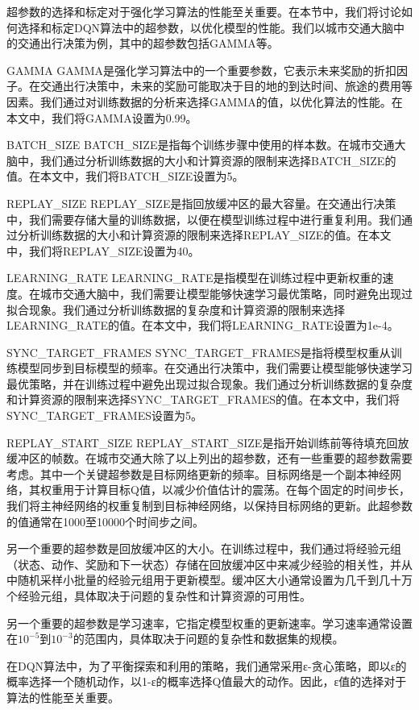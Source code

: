 超参数的选择和标定对于强化学习算法的性能至关重要。在本节中，我们将讨论如何选择和标定DQN算法中的超参数，以优化模型的性能。我们以城市交通大脑中的交通出行决策为例，其中的超参数包括GAMMA等。

GAMMA
GAMMA是强化学习算法中的一个重要参数，它表示未来奖励的折扣因子。在交通出行决策中，未来的奖励可能取决于目的地的到达时间、旅途的费用等因素。我们通过对训练数据的分析来选择GAMMA的值，以优化算法的性能。在本文中，我们将GAMMA设置为0.99。

BATCH\_SIZE
BATCH\_SIZE是指每个训练步骤中使用的样本数。在城市交通大脑中，我们通过分析训练数据的大小和计算资源的限制来选择BATCH\_SIZE的值。在本文中，我们将BATCH\_SIZE设置为5。

REPLAY\_SIZE
REPLAY\_SIZE是指回放缓冲区的最大容量。在交通出行决策中，我们需要存储大量的训练数据，以便在模型训练过程中进行重复利用。我们通过分析训练数据的大小和计算资源的限制来选择REPLAY\_SIZE的值。在本文中，我们将REPLAY\_SIZE设置为40。

LEARNING\_RATE
LEARNING\_RATE是指模型在训练过程中更新权重的速度。在城市交通大脑中，我们需要让模型能够快速学习最优策略，同时避免出现过拟合现象。我们通过分析训练数据的复杂度和计算资源的限制来选择LEARNING\_RATE的值。在本文中，我们将LEARNING\_RATE设置为1e-4。

SYNC\_TARGET\_FRAMES
SYNC\_TARGET\_FRAMES是指将模型权重从训练模型同步到目标模型的频率。在交通出行决策中，我们需要让模型能够快速学习最优策略，并在训练过程中避免出现过拟合现象。我们通过分析训练数据的复杂度和计算资源的限制来选择SYNC\_TARGET\_FRAMES的值。在本文中，我们将SYNC\_TARGET\_FRAMES设置为5。

REPLAY\_START\_SIZE
REPLAY\_START\_SIZE是指开始训练前等待填充回放缓冲区的帧数。在城市交通大除了以上列出的超参数，还有一些重要的超参数需要考虑。其中一个关键超参数是目标网络更新的频率。目标网络是一个副本神经网络，其权重用于计算目标Q值，以减少价值估计的震荡。在每个固定的时间步长，我们将主神经网络的权重复制到目标神经网络，以保持目标网络的更新。此超参数的值通常在1000至10000个时间步之间。

另一个重要的超参数是回放缓冲区的大小。在训练过程中，我们通过将经验元组（状态、动作、奖励和下一状态）存储在回放缓冲区中来减少经验的相关性，并从中随机采样小批量的经验元组用于更新模型。缓冲区大小通常设置为几千到几十万个经验元组，具体取决于问题的复杂性和计算资源的可用性。

另一个重要的超参数是学习速率，它指定模型权重的更新速率。学习速率通常设置在$10^{-5}$到$10^{-3}$的范围内，具体取决于问题的复杂性和数据集的规模。

在DQN算法中，为了平衡探索和利用的策略，我们通常采用ε-贪心策略，即以ε的概率选择一个随机动作，以1-ε的概率选择Q值最大的动作。因此，ε值的选择对于算法的性能至关重要。


